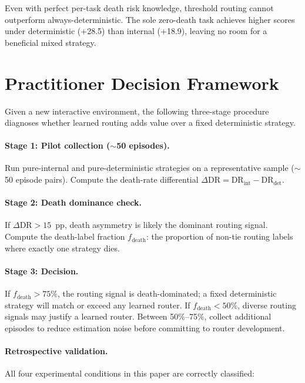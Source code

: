 \documentclass[11pt]{article}
\begin{document}
Even with perfect per-task death risk knowledge, threshold routing cannot outperform always-deterministic. The sole zero-death task achieves higher scores under deterministic (+28.5) than internal (+18.9), leaving no room for a beneficial mixed strategy.

\section{Practitioner Decision Framework}
\label{app:decision-framework}

Given a new interactive environment, the following three-stage procedure diagnoses whether learned routing adds value over a fixed deterministic strategy.

\paragraph{Stage 1: Pilot collection (${\sim}$50 episodes).}
Run pure-internal and pure-deterministic strategies on a representative sample (${\sim}$50 episode pairs). Compute the death-rate differential $\Delta\text{DR} = \text{DR}_{\text{int}} - \text{DR}_{\text{det}}$.

\paragraph{Stage 2: Death dominance check.}
If $\Delta\text{DR} > 15$~pp, death asymmetry is likely the dominant routing signal. Compute the death-label fraction $f_{\text{death}}$: the proportion of non-tie routing labels where exactly one strategy dies.

\paragraph{Stage 3: Decision.}
If $f_{\text{death}} > 75\%$, the routing signal is death-dominated; a fixed deterministic strategy will match or exceed any learned router. If $f_{\text{death}} < 50\%$, diverse routing signals may justify a learned router. Between 50\%--75\%, collect additional episodes to reduce estimation noise before committing to router development.

\paragraph{Retrospective validation.}
All four experimental conditions in this paper are correctly classified:
\end{document}
